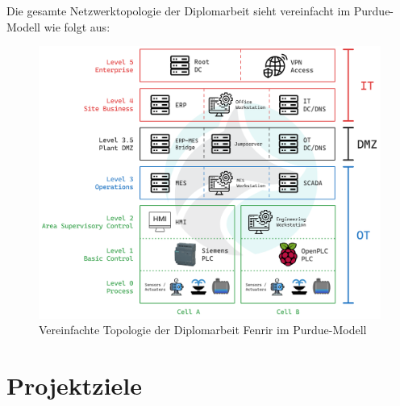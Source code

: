 \documentclass[
	headings=optiontotocandhead,%
	oneside,
	numbers=noenddot,%
	toc=flat, %
	10pt, %
	parskip=full, %
	listof=totoc, %
	listof=flat, %
	numbers=noenddot, %
	bibliography=totoc, %
	a4paper,DIV=14,
]{scrartcl}
\begin{document}
\newpage
Die gesamte Netzwerktopologie der Diplomarbeit sieht vereinfacht im Purdue-Modell wie folgt aus:
\begin{figure}[h]
	\centering
	\includegraphics[width=1\linewidth]{Purdue}
	\caption[]{Vereinfachte Topologie der Diplomarbeit Fenrir im Purdue-Modell}
\end{figure}
\FloatBarrier 

\newpage
\section{Projektziele}
\end{document}
